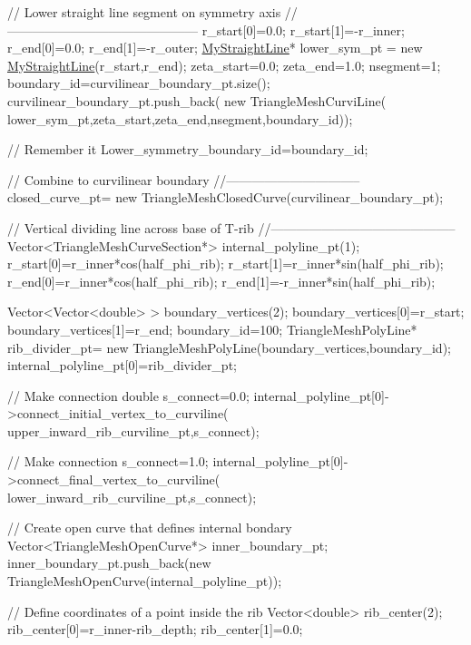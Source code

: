 \begin{DoxyCodeInclude}
 
 \textcolor{comment}{// Lower straight line segment on symmetry axis}
 \textcolor{comment}{//---------------------------------------------}
 r\_start[0]=0.0;
 r\_start[1]=-r\_inner;
 r\_end[0]=0.0;
 r\_end[1]=-r\_outer;
 \hyperlink{classMyStraightLine}{MyStraightLine}* lower\_sym\_pt = \textcolor{keyword}{new} \hyperlink{classMyStraightLine}{MyStraightLine}(r\_start,r\_end);
 zeta\_start=0.0;
 zeta\_end=1.0;
 nsegment=1;
 boundary\_id=curvilinear\_boundary\_pt.size();
 curvilinear\_boundary\_pt.push\_back(
  \textcolor{keyword}{new} TriangleMeshCurviLine(
   lower\_sym\_pt,zeta\_start,zeta\_end,nsegment,boundary\_id));
      
 \textcolor{comment}{// Remember it}
 Lower\_symmetry\_boundary\_id=boundary\_id;

 \textcolor{comment}{// Combine to curvilinear boundary}
 \textcolor{comment}{//--------------------------------}
 closed\_curve\_pt=
  \textcolor{keyword}{new} TriangleMeshClosedCurve(curvilinear\_boundary\_pt); 
 
  \textcolor{comment}{// Vertical dividing line across base of T-rib}
 \textcolor{comment}{//--------------------------------------------}
 Vector<TriangleMeshCurveSection*> internal\_polyline\_pt(1);
 r\_start[0]=r\_inner*cos(half\_phi\_rib);
 r\_start[1]=r\_inner*sin(half\_phi\_rib);
 r\_end[0]=r\_inner*cos(half\_phi\_rib);
 r\_end[1]=-r\_inner*sin(half\_phi\_rib);

 Vector<Vector<double> > boundary\_vertices(2);
 boundary\_vertices[0]=r\_start;
 boundary\_vertices[1]=r\_end;
 boundary\_id=100;
 TriangleMeshPolyLine* rib\_divider\_pt=
  \textcolor{keyword}{new} TriangleMeshPolyLine(boundary\_vertices,boundary\_id); 
 internal\_polyline\_pt[0]=rib\_divider\_pt;

 \textcolor{comment}{// Make connection}
 \textcolor{keywordtype}{double} s\_connect=0.0;
 internal\_polyline\_pt[0]->connect\_initial\_vertex\_to\_curviline(
  upper\_inward\_rib\_curviline\_pt,s\_connect);

 \textcolor{comment}{// Make connection}
 s\_connect=1.0;
 internal\_polyline\_pt[0]->connect\_final\_vertex\_to\_curviline(
  lower\_inward\_rib\_curviline\_pt,s\_connect);

 \textcolor{comment}{// Create open curve that defines internal bondary}
 Vector<TriangleMeshOpenCurve*> inner\_boundary\_pt;
 inner\_boundary\_pt.push\_back(\textcolor{keyword}{new} TriangleMeshOpenCurve(internal\_polyline\_pt));
 
 \textcolor{comment}{// Define coordinates of a point inside the rib}
 Vector<double> rib\_center(2);
 rib\_center[0]=r\_inner-rib\_depth;
 rib\_center[1]=0.0;


\end{DoxyCodeInclude}

